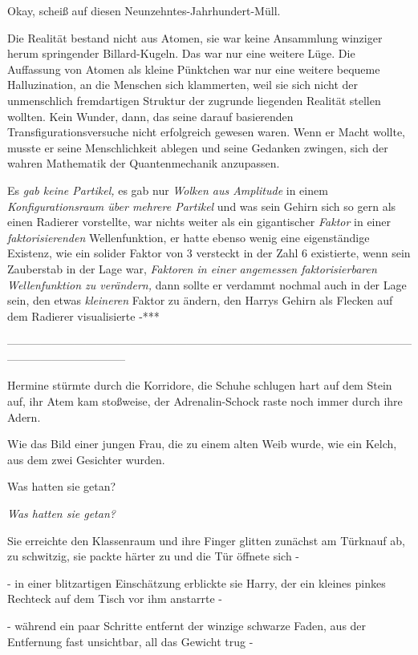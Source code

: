 {Okay, scheiß auf diesen Neunzehntes-Jahrhundert-Müll.

Die Realität bestand nicht aus Atomen, sie war keine Ansammlung winziger herum springender Billard-Kugeln. Das war nur eine weitere Lüge. Die Auffassung von Atomen als kleine Pünktchen war nur eine weitere bequeme Halluzination, an die Menschen sich klammerten, weil sie sich nicht der unmenschlich fremdartigen Struktur der zugrunde liegenden Realität stellen wollten. Kein Wunder, dann, das seine darauf basierenden Transfigurationsversuche nicht erfolgreich gewesen waren. Wenn er Macht wollte, musste er seine Menschlichkeit ablegen und seine Gedanken zwingen, sich der wahren Mathematik der Quantenmechanik anzupassen.

Es \emph{gab keine Partikel,} es gab nur \emph{Wolken aus Amplitude} in einem \emph{Konfigurationsraum über mehrere Partikel} und was sein Gehirn sich so gern als einen Radierer vorstellte, war nichts weiter als ein gigantischer \emph{Faktor} in einer \emph{faktorisierenden} Wellenfunktion, er hatte ebenso wenig eine eigenständige Existenz, wie ein solider Faktor von 3 versteckt in der Zahl 6 existierte, wenn sein Zauberstab in der Lage war, \emph{Faktoren in einer angemessen faktorisierbaren Wellenfunktion zu verändern,} dann sollte er verdammt nochmal auch in der Lage sein, den etwas \emph{kleineren} Faktor zu ändern, den Harrys Gehirn als Flecken auf dem Radierer visualisierte -***

--------------------------------------------------------------------------------------------------------------------------------------------

\hfill\break Hermine stürmte durch die Korridore, die Schuhe schlugen hart auf dem Stein auf, ihr Atem kam stoßweise, der Adrenalin-Schock raste noch immer durch ihre Adern.

Wie das Bild einer jungen Frau, die zu einem alten Weib wurde, wie ein Kelch, aus dem zwei Gesichter wurden.

Was hatten sie getan?

\emph{Was hatten sie getan?}

Sie erreichte den Klassenraum und ihre Finger glitten zunächst am Türknauf ab, zu schwitzig, sie packte härter zu und die Tür öffnete sich -

- in einer blitzartigen Einschätzung erblickte sie Harry, der ein kleines pinkes Rechteck auf dem Tisch vor ihm anstarrte -

- während ein paar Schritte entfernt der winzige schwarze Faden, aus der Entfernung fast unsichtbar, all das Gewicht trug -

}
